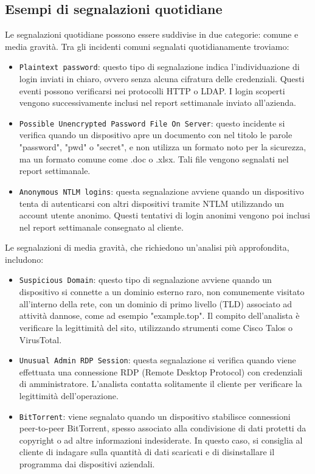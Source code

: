 \subsection{Esempi di segnalazioni quotidiane}
Le segnalazioni quotidiane possono essere suddivise in due categorie: comune e media gravità. Tra gli incidenti comuni segnalati quotidianamente troviamo:
\begin{itemize}
	\item \texttt{Plaintext password}: questo tipo di segnalazione indica l'individuazione di login inviati in chiaro, ovvero senza alcuna cifratura delle credenziali. Questi eventi possono verificarsi nei protocolli HTTP o LDAP. I login scoperti vengono successivamente inclusi nel report settimanale inviato all'azienda.
	\item \texttt{Possible Unencrypted Password File On Server}: questo incidente si verifica quando un dispositivo apre un documento con nel titolo le parole "password", "pwd" o "secret", e non utilizza un formato noto per la sicurezza, ma un formato comune come .doc o .xlsx. Tali file vengono segnalati nel report settimanale.
	\item \texttt{Anonymous NTLM logins}: questa segnalazione avviene quando un dispositivo tenta di autenticarsi con altri dispositivi tramite NTLM utilizzando un account utente anonimo. Questi tentativi di login anonimi vengono poi inclusi nel report settimanale consegnato al cliente.
\end{itemize}
Le segnalazioni di media gravità, che richiedono un'analisi più approfondita, includono:
\begin{itemize}
	\item \texttt{Suspicious Domain}: questo tipo di segnalazione avviene quando un dispositivo si connette a un dominio esterno raro, non comunemente visitato all'interno della rete, con un dominio di primo livello (TLD) associato ad attività dannose, come ad esempio "example.top". Il compito dell'analista è verificare la legittimità del sito, utilizzando strumenti come Cisco Talos o VirusTotal.
	\item \texttt{Unusual Admin RDP Session}: questa segnalazione si verifica quando viene effettuata una connessione RDP (Remote Desktop Protocol) con credenziali di amministratore. L'analista contatta solitamente il cliente per verificare la legittimità dell'operazione.
	\item \texttt{BitTorrent}: viene segnalato quando un dispositivo stabilisce connessioni peer-to-peer BitTorrent, spesso associato alla condivisione di dati protetti da copyright o ad altre informazioni indesiderate. In questo caso, si consiglia al cliente di indagare sulla quantità di dati scaricati e di disinstallare il programma dai dispositivi aziendali.
\end{itemize}


